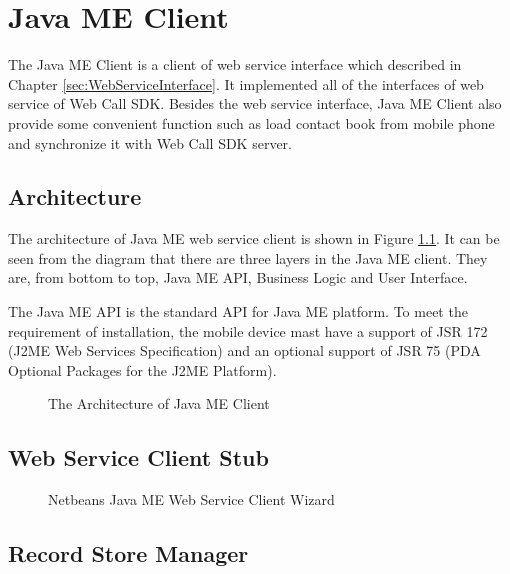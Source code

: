 
\chapter{Java ME Client}
\label{sec:JavaMEClient}

The Java ME Client is a client of web service interface which described in Chapter \nolinebreak \ref{sec:WebServiceInterface}. It implemented all of the interfaces of web service of Web Call SDK. Besides the web service interface, Java ME Client also provide some convenient function such as load contact book from mobile phone and synchronize it with Web Call SDK server. 

\section{Architecture}
\label{sec:JavaMEClient:Architecture}

The architecture of Java ME web service client is shown in Figure \nolinebreak \ref{fig:TheArchitectureOfJavaMEClient}. It can be seen from the diagram that there are three layers in the Java ME client. They are, from bottom to top, Java ME API, Business Logic and User Interface. 

The Java ME API is the standard API for Java ME platform. To meet the requirement of installation, the mobile device mast have a support of JSR 172 (J2ME\texttrademark{} Web Services Specification)\cite{JSR172} and an optional support of JSR 75 (PDA Optional Packages for the J2ME Platform)\cite{JSR75}. 

\begin{figure}[!hbtp]
\centering
{}
\caption{The Architecture of Java ME Client}
\label{fig:TheArchitectureOfJavaMEClient}
\end{figure}


\section{Web Service Client Stub}
\label{sec:JavaMEClient:WebServiceClientStub}


\begin{figure}[!hbtp]
\centering
{}
\caption{Netbeans Java ME Web Service Client Wizard}
\label{fig:NetbeansJavaMEWebServiceClientWizard}
\end{figure}

\section{Record Store Manager}
\label{sec:JavaMEClient:RecordStoreManager}

